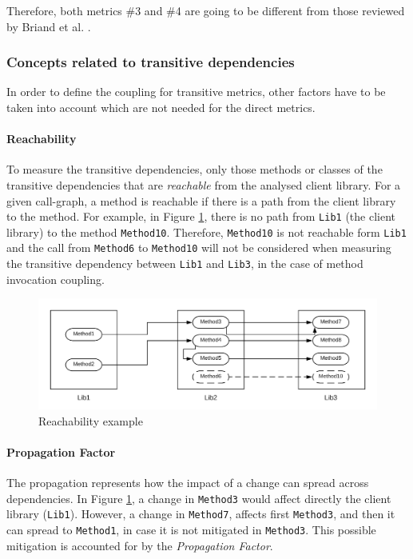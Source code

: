 Therefore, both metrics \#3 and \#4 are going to be different from those reviewed by Briand et al. \cite{briand1999unified}.

\subsubsection{Concepts related to transitive dependencies}
In order to define the coupling for transitive metrics, other factors have to be taken into account which are not needed for the direct metrics.

\paragraph{Reachability}
To measure the transitive dependencies, only those methods or classes of the transitive dependencies that are \textit{reachable} from the analysed client library. For a given call-graph, a method is reachable if there is a path from the client library to the method. For example, in Figure \ref{fig:reachability}, there is no path from \texttt{Lib1} (the client library) to the method \texttt{Method10}. Therefore, \texttt{Method10} is not reachable form \texttt{Lib1} and the call from \texttt{Method6} to \texttt{Method10} will not be considered when measuring the transitive dependency between \texttt{Lib1} and \texttt{Lib3}, in the case of method invocation coupling.

\begin{figure}[ht]
\begin{center}
\includegraphics[width=\textwidth]{figures/Reachability.png}
\caption{Reachability example}
\label{fig:reachability}
\end{center}
\end{figure}

\paragraph{Propagation Factor}
The propagation represents how the impact of a change can spread across dependencies. In Figure \ref{fig:reachability}, a change in \texttt{Method3} would affect directly the client  library (\texttt{Lib1}). However, a change in \texttt{Method7}, affects first \texttt{Method3}, and then it can spread to \texttt{Method1}, in case it is not mitigated in \texttt{Method3}. This possible mitigation is accounted for by the \textit{Propagation Factor}.

